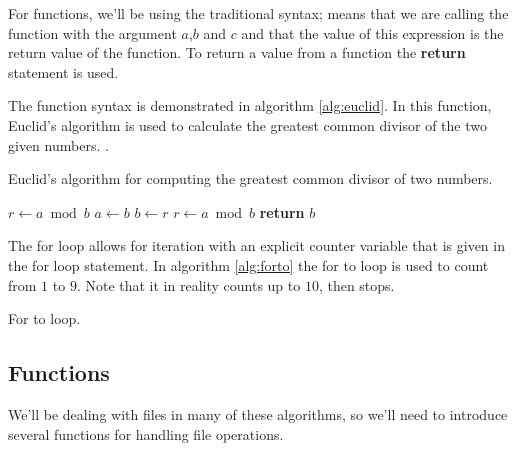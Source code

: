 For functions, we'll be using the traditional syntax;
 means that we are calling the function
 with the argument $a$,$b$ and $c$ and that the value
of this expression is the return value of the function. To return a
value from a function the \textbf{return} statement is used.

The function syntax is demonstrated in algorithm \ref{alg:euclid}. In
this function, Euclid's algorithm is used to calculate the greatest
common divisor of the two given numbers.
\cite{cormen2009introduction_to_algo,weisstein:_euclid_algor}.

\begin{algorithm}
  \caption{Euclid's algorithm for computing the greatest common
    divisor of two numbers.}
  \label{alg:euclid}
  \begin{algorithmic}[1]
    \State $r\gets a\bmod b$
    \State $a\gets b$
    \State $b\gets r$
    \State $r\gets a\bmod b$
    \EndWhile
    \State \textbf{return} $b$
    \EndProcedure
  \end{algorithmic}
\end{algorithm}

The for loop allows for iteration with an explicit counter variable
that is given in the for loop statement. In algorithm \ref{alg:forto}
the for to loop is used to count from $1$ to $9$. Note that it in
reality counts up to $10$, then stops.

\begin{algorithm}
  \caption{For to loop.}
  \label{alg:forto}
  \begin{algorithmic}[1]
    \EndFor
  \end{algorithmic}
\end{algorithm}

\subsection{Functions}
\label{sec:pseudocode}

We'll be dealing with files in many of these algorithms, so we'll need
to introduce several functions for handling file operations.

